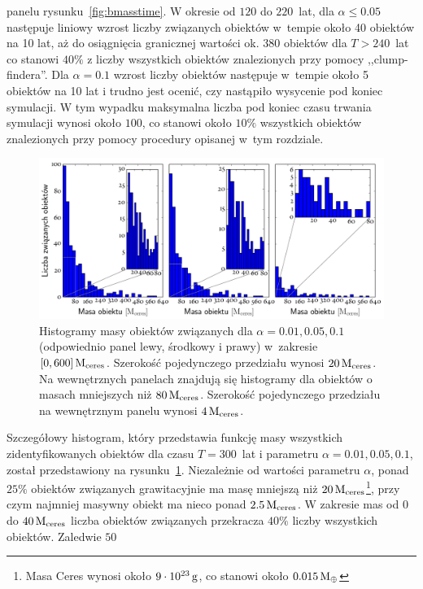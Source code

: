 panelu rysunku~\ref{fig:bmasstime}. W okresie od $120$ do $220$~lat, dla $\alpha
\leq 0.05$ następuje liniowy wzrost liczby związanych obiektów w~tempie około 40
obiektów na 10 lat, aż do osiągnięcia granicznej wartości ok. $380$ obiektów dla
$T > 240$~lat co stanowi $40\%$ z liczby wszystkich obiektów znalezionych przy
pomocy ,,clump-findera''. Dla $\alpha = 0.1$ wzrost liczby obiektów następuje
w~tempie około 5 obiektów na 10 lat i trudno jest ocenić, czy nastąpiło
wysycenie pod koniec symulacji. W tym wypadku maksymalna liczba pod koniec czasu
trwania symulacji wynosi około $100$, co stanowi około $10\%$ wszystkich
obiektów znalezionych przy pomocy procedury opisanej w~tym rozdziale.
%
\begin{figure}[ht]
   \centering
   \includegraphics[width=0.95\linewidth]{figures/mass_hists}
   \caption[Histogramy masy obiektów związanych dla $\alpha = 0.01, 0.05, 0.1$.]
   {Histogramy masy obiektów związanych dla $\alpha = 0.01, 0.05, 0.1$
   (odpowiednio panel lewy, środkowy i prawy) w~zakresie $[0,600]\hbox{$\mathrm{\thinspace M_{\textrm{ceres}}}$}$.
   Szerokość pojedynczego przedziału wynosi $20\hbox{$\mathrm{\thinspace M_{\textrm{ceres}}}$}$. Na wewnętrznych
   panelach znajdują się histogramy dla obiektów o masach mniejszych niż
   $80\hbox{$\mathrm{\thinspace M_{\textrm{ceres}}}$}$. Szerokość pojedynczego przedziału na wewnętrznym panelu wynosi
   $4\hbox{$\mathrm{\thinspace M_{\textrm{ceres}}}$}$.}
   \label{fig:masshist}
\end{figure}
%
\par Szczegółowy histogram, który przedstawia funkcję masy wszystkich
zidentyfikowanych o\-bie\-któw dla czasu $T=300$~lat i parametru $\alpha = 0.01,
0.05, 0.1$, został przedstawiony na rysunku~\ref{fig:masshist}. Niezależnie od
wartości parametru $\alpha$, ponad $25\%$ obiektów związanych grawitacyjnie ma
masę mniejszą niż $20\hbox{$\mathrm{\thinspace M_{\textrm{ceres}}}$}$\footnote{Masa Ceres wynosi około
$9\cdot10^{23}\hbox{$\thinspace\textrm{g}$}$, co stanowi około $0.015\hbox{$\mathrm{\thinspace M_{\oplus}}$}$}, przy czym najmniej masywny
obiekt ma nieco ponad $2.5\hbox{$\mathrm{\thinspace M_{\textrm{ceres}}}$}$.  W zakresie mas od $0$ do $40\hbox{$\mathrm{\thinspace M_{\textrm{ceres}}}$}$ liczba
obiektów związanych przekracza $40\%$ liczby wszystkich obiektów. Zaledwie $50$
